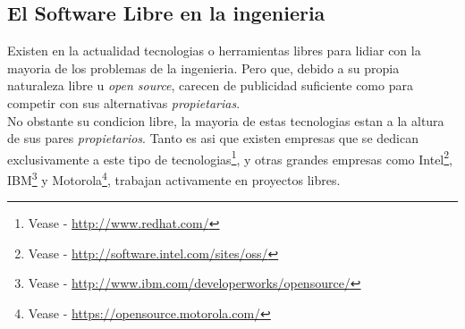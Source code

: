 \subsection{El Software Libre en la ingenieria} 
Existen en la actualidad tecnologias o herramientas libres para lidiar con la
mayoria de los problemas de la ingenieria. Pero que, debido a su propia
naturaleza libre u \emph{open source}, carecen de publicidad suficiente como
para competir con sus alternativas \emph{propietarias}. \\

No obstante su condicion libre, la mayoria de estas tecnologias estan a la
altura de sus pares \emph{propietarios}. Tanto es asi que existen empresas que
se dedican exclusivamente a este tipo de tecnologias\footnote{Vease -
\url{http://www.redhat.com/}}, y otras grandes empresas como
Intel\footnote{Vease - \url{http://software.intel.com/sites/oss/}},
IBM\footnote{Vease - \url{http://www.ibm.com/developerworks/opensource/}} y
Motorola\footnote{Vease - \url{https://opensource.motorola.com/}}, trabajan
activamente en proyectos libres.\\
